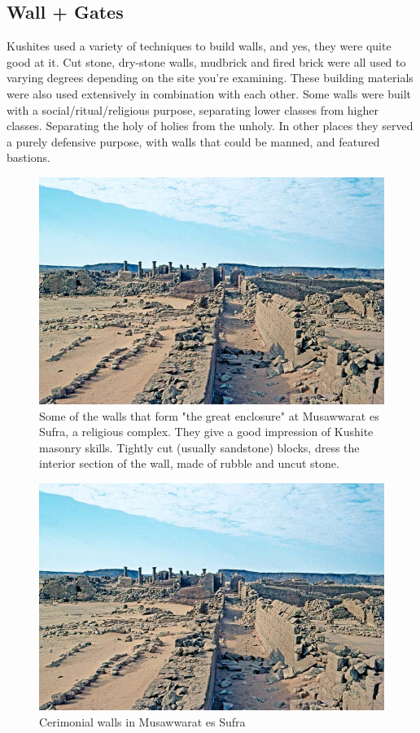 \documentclass[a4paper,12pt]{scrreprt}
\begin{document}
\subsection{Wall + Gates}

Kushites used a variety of techniques to build walls, and yes, they were quite good at it. Cut stone, dry-stone walls, mudbrick and fired brick were all used to varying degrees depending on the site you’re examining. These building materials were also used extensively in combination with each other. Some walls were built with a social/ritual/religious purpose, separating lower classes from higher classes. Separating the holy of holies from the unholy. In other places they served a purely defensive purpose, with walls that could be manned, and featured bastions.

\begin{figure}[H]
	\centering
	\includegraphics[width=\textwidth]{img/walls_gates/impression_of_wall}
	\caption{Some of the walls that form "the great enclosure" at Musawwarat es Sufra, a religious complex. They give a good impression of Kushite masonry skills. Tightly cut (usually sandstone) blocks, dress the interior section of the wall, made of rubble and uncut stone.}
\end{figure}

\begin{figure}[H]
	\centering
	\includegraphics[width=\textwidth]{img/walls_gates/impression_of_wall}
	\caption{Cerimonial walls in Musawwarat es Sufra }
\end{figure}
\end{document}
